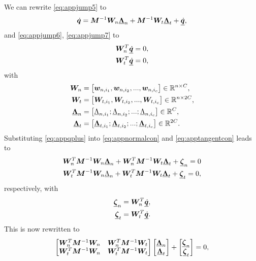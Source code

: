 \documentclass[../DC2017114Bouma.tex]{subfiles}
\begin{document}
We can rewrite \eqref{eq:appjump5} to
\begin{align}
\dot{{\boldsymbol{q}}} = {\boldsymbol{M}}^{-1}{\boldsymbol{W}}_{n}\underline{\boldsymbol{\Lambda}}_{n} + {\boldsymbol{M}}^{-1}{\boldsymbol{W}}_{t}\underline{\boldsymbol{\Lambda}}_{t} + \underline{\dot{{\boldsymbol{q}}}},\label{eq:appqplus}
\end{align}
and \eqref{eq:appjump6}, \eqref{eq:appjump7} to
\begin{align}
{\boldsymbol{W}}_{n}^T\underline{\dot{{\boldsymbol{q}}}} = 0,\label{eq:appnormalcon}\\
{\boldsymbol{W}}_{t}^T\underline{\dot{{\boldsymbol{q}}}} = 0,\label{eq:apptangentcon}
\end{align}
with
\begin{align}
{\boldsymbol{W}}_n &= \begin{bmatrix}
{\boldsymbol{w}}_{n,i_1},{\boldsymbol{w}}_{n,i_2},...,{\boldsymbol{w}}_{n,i_c}
\end{bmatrix}\in\mathbb{R}^{n\times C},\\
{\boldsymbol{W}}_t &= \begin{bmatrix}
{\boldsymbol{W}}_{t,i_1},{\boldsymbol{W}}_{t,i_2},...,{\boldsymbol{W}}_{t,i_c} 
\end{bmatrix}\in\mathbb{R}^{n\times 2C},\\
\underline{\boldsymbol{\Lambda}}_n &= \begin{bmatrix}
\underline{\Lambda}_{n,i_1};\underline{\Lambda}_{n,i_2};...;\underline{\Lambda}_{n,i_c} 
\end{bmatrix}\in\mathbb{R}^{C},\\
\underline{\boldsymbol{\Lambda}}_t &= \begin{bmatrix}
\underline{\boldsymbol{\Lambda}}_{t,i_1};\underline{\boldsymbol{\Lambda}}_{t,i_2};...;\underline{\boldsymbol{\Lambda}}_{t,i_c} 
\end{bmatrix}\in\mathbb{R}^{2C}.
\end{align}
Substituting \eqref{eq:appqplus} into \eqref{eq:appnormalcon} and \eqref{eq:apptangentcon} leads to
\begin{align}
{\boldsymbol{W}}_{n}^T{\boldsymbol{M}}^{-1}{\boldsymbol{W}}_{n}\underline{\boldsymbol{\Lambda}}_{n} + {\boldsymbol{W}}_{n}^T{\boldsymbol{M}}^{-1}{\boldsymbol{W}}_{t}\underline{\boldsymbol{\Lambda}}_{t} + \underline{\boldsymbol{\zeta}}_{n} = 0\\
{\boldsymbol{W}}_{t}^T{\boldsymbol{M}}^{-1}{\boldsymbol{W}}_{n}\underline{\Lambda}_{n} + {\boldsymbol{W}}_{t}^T{\boldsymbol{M}}^{-1}{\boldsymbol{W}}_{t}\underline{\boldsymbol{\Lambda}}_{t} + \underline{\boldsymbol{\zeta}}_{t} = 0,
\end{align}
respectively, with 
\begin{align}
\underline{\boldsymbol{\zeta}}_{n} = {\boldsymbol{W}}_n^T\underline{\dot{{\boldsymbol{q}}}},\\
\underline{\boldsymbol{\zeta}}_{t} = {\boldsymbol{W}}_t^T\underline{\dot{{\boldsymbol{q}}}}.
\end{align}
This is now rewritten to
\begin{align}
\begin{bmatrix}
{\boldsymbol{W}}_{n}^T{\boldsymbol{M}}^{-1}{\boldsymbol{W}}_{n} & {\boldsymbol{W}}_{n}^T{\boldsymbol{M}}^{-1}{\boldsymbol{W}}_{t} \\
{\boldsymbol{W}}_{t}^T{\boldsymbol{M}}^{-1}{\boldsymbol{W}}_{n} & {\boldsymbol{W}}_{t}^T{\boldsymbol{M}}^{-1}{\boldsymbol{W}}_{t}
\end{bmatrix}
\begin{bmatrix}
\underline{\boldsymbol{\Lambda}}_{n}\\
\underline{\boldsymbol{\Lambda}}_{t}
\end{bmatrix} + \begin{bmatrix}
\underline{\boldsymbol{\zeta}}_{n}\\
\underline{\boldsymbol{\zeta}}_{t}
\end{bmatrix}
= 0,
\end{align}
\end{document}
